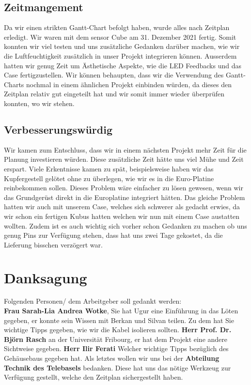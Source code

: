 \documentclass{article}
\newlength\mylength
\begin{document}
\begin{table}
\begin{tabular}{p{\mylength}|p{\mylength}|p{\mylength}}
        \hline
    \end{tabular}
    \label{table:problems}
\end{table}
\newpage
\subsection{Zeitmangement}
Da wir einen strikten Gantt-Chart befolgt haben, wurde alles nach Zeitplan erledigt. Wir waren mit dem sensor Cube am 31. Dezember 2021 fertig. Somit konnten wir viel testen und uns zusätzliche Gedanken darüber machen, wie wir die Luftfeuchtigkeit zusätzlich in unser Projekt integrieren können. Ausserdem hatten wir genug Zeit um Ästhetische Aspekte, wie die LED Feedbacks und das Case fertigzustellen. Wir können behaupten, dass wir die Verwendung des Gantt-Charts nochmal in einem ähnlichen Projekt einbinden würden, da dieses den Zeitplan relativ gut eingeteilt hat und wir somit immer wieder überprüfen konnten, wo wir stehen.  
\subsection{Verbesserungswürdig}
Wir kamen zum Entschluss, dass wir in einem nächsten Projekt mehr Zeit für die Planung investieren würden. Diese zusätzliche Zeit hätte uns viel Mühe und Zeit erspart. Viele Erkentnisse kamen zu spät, beispielsweise haben wir das Kupfergestell gelötet ohne zu überlegen, wie wir es in die Euro-Platine reinbekommen sollen. Dieses Problem wäre einfacher zu lösen gewesen, wenn wir das Grundgerüst direkt in die Europlatine integriert hätten. Das gleiche Problem hatten wir auch mit unserem Case, welches sich schwerer als gedacht erwies, da wir schon ein fertigen Kubus hatten welchen wir nun mit einem Case austatten wollten. Zudem ist es auch wichtig sich vorher schon Gedanken zu machen ob uns genug Pins zur Verfügung stehen, dass hat uns zwei Tage gekostet, da die Lieferung bisschen verzögert war.
\newpage
\section{Danksagung}
Folgenden Personen/ dem Arbeitgeber soll gedankt werden: \\
\newline \textbf{Frau Sarah-Lia Andrea Wotke}, Sie hat Ugur eine Einführung in das Löten gegeben, er konnte sein Wissen mit Berkan und Silvan teilen. Zu dem hat Sie wichtige Tipps gegeben, wie wir die Kabel isolieren sollten. \newline \newline
\textbf{Herr Prof. Dr. Björn Rasch} an der Universität Fribourg, er hat dem Projekt eine andere Sichtweise gegeben.\newline \newline
\textbf{Herr Ilir Ferati} Welcher wichtige Tipps bezüglich des Gehäusebaus gegeben hat.\newline \newline
Als letztes wollen wir uns bei der \textbf{Abteilung Technik des Telebasels} bedanken. Diese hat uns das nötige Werkzeug zur Verfügung gestellt, welche den Zeitplan sichergestellt haben.
\end{document}
